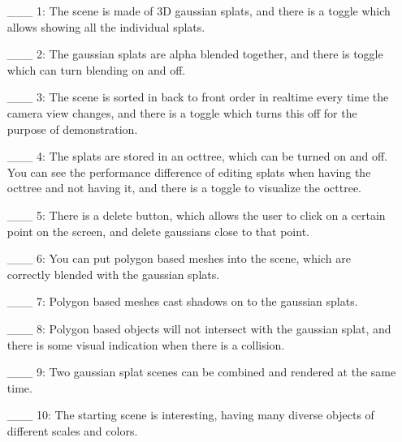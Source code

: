 \documentclass {article}
\begin{document}
\begin{enumerate}
     \item[\_\_\_ 1:] The scene is made of 3D gaussian splats, and there is a toggle which allows showing all the individual splats.
     
     \item[\_\_\_ 2:] The gaussian splats are alpha blended together, and there is toggle which can turn blending on and off.

     \item[\_\_\_ 3:] The scene is sorted in back to front order in realtime every time the camera view changes, and there is a toggle which turns this off for the purpose of demonstration.

     \item[\_\_\_ 4:] The splats are stored in an octtree, which can be turned on and off. You can see the performance difference of editing splats when having the octtree and not having it, and there is a toggle to visualize the octtree.

     \item[\_\_\_ 5:]  There is a delete button, which allows the user to click on a certain point on the screen, and delete gaussians close to that point.

     \item[\_\_\_ 6:] You can put polygon based meshes into the scene, which are correctly blended with the gaussian splats.

     \item[\_\_\_ 7:] Polygon based meshes cast shadows on to the gaussian splats.

     \item[\_\_\_ 8:] Polygon based objects will not intersect with the gaussian splat, and there is some visual indication when there is a collision.

     \item[\_\_\_ 9:]  Two gaussian splat scenes can be combined and rendered at the same time.

     \item[\_\_\_ 10:] The starting scene is interesting, having many diverse objects of different scales and colors.


\end{enumerate}

\end{document}
